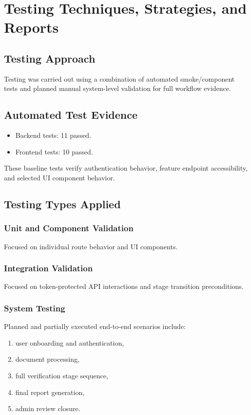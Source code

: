 \chapter{Testing Techniques, Strategies, and Reports}

\section{Testing Approach}
Testing was carried out using a combination of automated smoke/component tests and planned manual system-level validation for full workflow evidence.

\section{Automated Test Evidence}
\begin{itemize}
\item Backend tests: 11 passed.
\item Frontend tests: 10 passed.
\end{itemize}

These baseline tests verify authentication behavior, feature endpoint accessibility, and selected UI component behavior.

\section{Testing Types Applied}
\subsection{Unit and Component Validation}
Focused on individual route behavior and UI components.

\subsection{Integration Validation}
Focused on token-protected API interactions and stage transition preconditions.

\subsection{System Testing}
Planned and partially executed end-to-end scenarios include:
\begin{enumerate}
\item user onboarding and authentication,
\item document processing,
\item full verification stage sequence,
\item final report generation,
\item admin review closure.
\end{enumerate}

